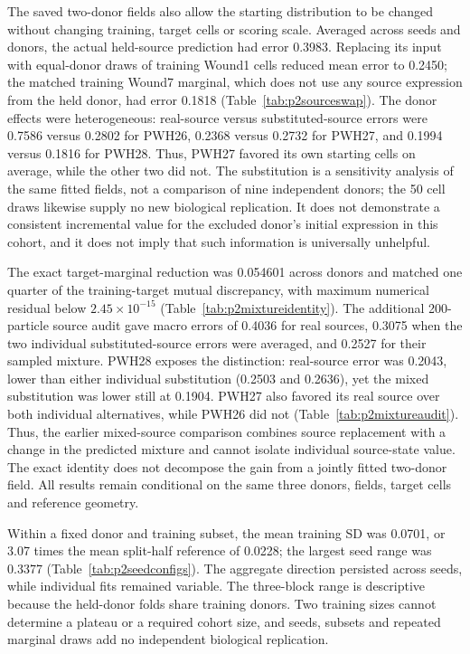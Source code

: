 The saved two-donor fields also allow the starting distribution to be changed without changing training, target cells or scoring scale. Averaged across seeds and donors, the actual held-source prediction had error 0.3983. Replacing its input with equal-donor draws of training Wound1 cells reduced mean error to 0.2450; the matched training Wound7 marginal, which does not use any source expression from the held donor, had error 0.1818 (Table~\ref{tab:p2sourceswap}). The donor effects were heterogeneous: real-source versus substituted-source errors were 0.7586 versus 0.2802 for PWH26, 0.2368 versus 0.2732 for PWH27, and 0.1994 versus 0.1816 for PWH28. Thus, PWH27 favored its own starting cells on average, while the other two did not. The substitution is a sensitivity analysis of the same fitted fields, not a comparison of nine independent donors; the 50 cell draws likewise supply no new biological replication. It does not demonstrate a consistent incremental value for the excluded donor's initial expression in this cohort, and it does not imply that such information is universally unhelpful.

The exact target-marginal reduction was 0.054601 across donors and matched one quarter of the training-target mutual discrepancy, with maximum numerical residual below $2.45\times10^{-15}$ (Table~\ref{tab:p2mixtureidentity}). The additional 200-particle source audit gave macro errors of 0.4036 for real sources, 0.3075 when the two individual substituted-source errors were averaged, and 0.2527 for their sampled mixture. PWH28 exposes the distinction: real-source error was 0.2043, lower than either individual substitution (0.2503 and 0.2636), yet the mixed substitution was lower still at 0.1904. PWH27 also favored its real source over both individual alternatives, while PWH26 did not (Table~\ref{tab:p2mixtureaudit}). Thus, the earlier mixed-source comparison combines source replacement with a change in the predicted mixture and cannot isolate individual source-state value. The exact identity does not decompose the gain from a jointly fitted two-donor field. All results remain conditional on the same three donors, fields, target cells and reference geometry.

Within a fixed donor and training subset, the mean training SD was 0.0701, or 3.07 times the mean split-half reference of 0.0228; the largest seed range was 0.3377 (Table~\ref{tab:p2seedconfigs}). The aggregate direction persisted across seeds, while individual fits remained variable. The three-block range is descriptive because the held-donor folds share training donors. Two training sizes cannot determine a plateau or a required cohort size, and seeds, subsets and repeated marginal draws add no independent biological replication.

